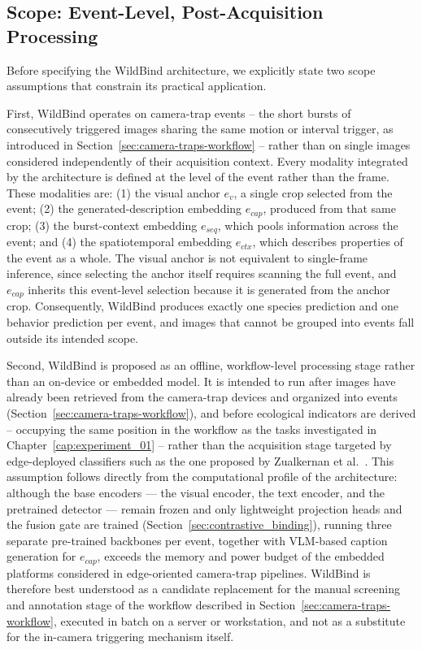 \subsection{Scope: Event-Level, Post-Acquisition Processing}\label{sec:wildbind_scope}

Before specifying the WildBind architecture, we explicitly state two scope assumptions that constrain its practical application.

First, WildBind operates on camera-trap events -- the short bursts of consecutively triggered images sharing the same motion or interval trigger, as introduced in Section~\ref{sec:camera-traps-workflow} -- rather than on single images considered independently of their acquisition context. Every modality integrated by the architecture is defined at the level of the event rather than the frame. These modalities are: (1) the visual anchor $e_v$, a single crop selected from the event; (2) the generated-description embedding $e_{cap}$, produced from that same crop; (3) the burst-context embedding $e_{seq}$, which pools information across the event; and (4) the spatiotemporal embedding $e_{ctx}$, which describes properties of the event as a whole. The visual anchor is not equivalent to single-frame inference, since selecting the anchor itself requires scanning the full event, and $e_{cap}$ inherits this event-level selection because it is generated from the anchor crop. Consequently, WildBind produces exactly one species prediction and one behavior prediction per event, and images that cannot be grouped into events fall outside its intended scope.

Second, WildBind is proposed as an offline, workflow-level processing stage rather than an on-device or embedded model. It is intended to run after images have already been retrieved from the camera-trap devices and organized into events (Section~\ref{sec:camera-traps-workflow}), and before ecological indicators are derived -- occupying the same position in the workflow as the tasks investigated in Chapter~\ref{cap:experiment_01} -- rather than the acquisition stage targeted by edge-deployed classifiers such as the one proposed by Zualkernan et al.~\citep{zualkernan2022iot}. This assumption follows directly from the computational profile of the architecture: although the base encoders --- the visual encoder, the text encoder, and the pretrained detector --- remain frozen and only lightweight projection heads and the fusion gate are trained (Section~\ref{sec:contrastive_binding}), running three separate pre-trained backbones per event, together with VLM-based caption generation for $e_{cap}$, exceeds the memory and power budget of the embedded platforms considered in edge-oriented camera-trap pipelines. WildBind is therefore best understood as a candidate replacement for the manual screening and annotation stage of the workflow described in Section~\ref{sec:camera-traps-workflow}, executed in batch on a server or workstation, and not as a substitute for the in-camera triggering mechanism itself.

